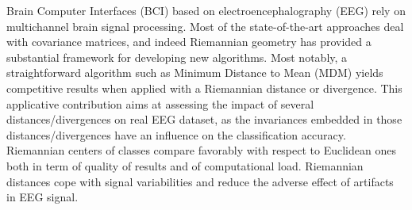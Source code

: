 Brain Computer Interfaces (BCI) based on electroencephalography (EEG) rely on multichannel brain signal processing. Most of the state-of-the-art approaches deal with covariance matrices, and indeed Riemannian geometry has provided a substantial framework for developing new algorithms. Most notably, a straightforward algorithm such as Minimum Distance to Mean (MDM) yields competitive results when applied with a Riemannian distance or divergence. This applicative contribution aims at assessing the impact of several distances/divergences on real EEG dataset, as the invariances embedded in those distances/divergences have an influence on the classification accuracy. Riemannian centers of classes compare favorably with respect to Euclidean ones both in term of quality of results and of computational load. Riemannian distances cope with signal variabilities and reduce the adverse effect of artifacts in EEG signal.